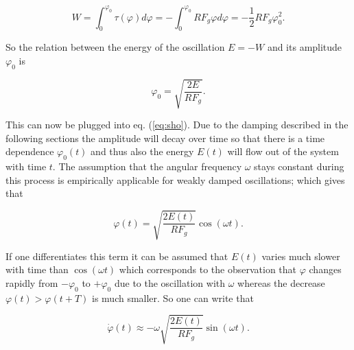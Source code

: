 \begin{equation}
W = \int_0^{\varphi_0} \tau(\varphi) d\varphi = -\int_0^{\varphi_0} R F_g \varphi d\varphi = -\frac{1}{2}
R F_g \varphi_0^2.
\end{equation}

So the relation between the energy of the oscillation $E=-W$ and its amplitude $\varphi_0$ is

\begin{equation}\label{eq:ephi}
\varphi_0 = \sqrt{\frac{2E}{R F_g}}.
\end{equation} 

This can now be plugged into eq. (\ref{eq:sho}). Due to the damping described in the following sections the amplitude will decay over time so that there is a time dependence $\varphi_0(t)$ and thus also the energy $E(t)$ will flow out of the system with time $t$. The assumption that the angular frequency $\omega$ stays constant during this process is empirically applicable for weakly damped oscillations; which gives that

\begin{equation}\label{eqphi}
\varphi(t) = \sqrt{\frac{2 E(t)}{R F_g}}  \cos\left(\omega t \right).
\end{equation}

If one differentiates this term it can be assumed that $E(t)$ varies much slower with time than $\cos\left(\omega t \right)$ which corresponds to the observation that $\varphi$ changes rapidly from $-\varphi_0$ to $+\varphi_0$ due to the oscillation with  $\omega$ whereas the decrease  $\varphi(t)>\varphi(t+T)$ is much smaller. So one can write that

\begin{equation}\label{eqphi_dot}
\dot{\varphi}(t) \approx  -\omega \sqrt{\frac{2 E(t)}{R F_g}} \sin\left(\omega t \right).
\end{equation}


